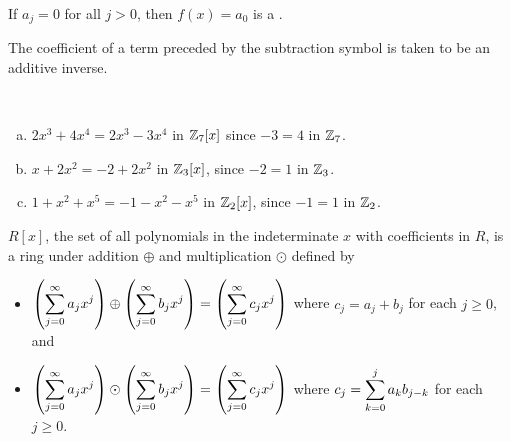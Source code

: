 \documentclass[11pt,fleqn,dvipsnames,usenames]{article}
\newcommand{\p}{\noindent}
\begin{document}
\terminology If $a_{j} = 0$ for all $j > 0$, then $f(x) = a_{0}$ is a .
\vsp

\p The coefficient of a term preceded by the subtraction symbol is taken to be an additive inverse.
\vsp

\begin{examples}~
\begin{enumerate}[(a)]
\item $2x^3 + 4x^4 = 2x^3 - 3x^4$ in $\mathbb{Z}_{7}[x]$ since $-3 = 4$ in $\mathbb{Z}_{7}$.
\item $x + 2x^2 = -2 + 2x^2$ in $\mathbb{Z}_{3}[x]$, since $-2 = 1$ in $\mathbb{Z}_{3}$.
\item $1 + x^2 + x^5 = -1 - x^2 - x^5$ in $\mathbb{Z}_{2}[x]$, since $-1 = 1$ in $\mathbb{Z}_{2}$.
\end{enumerate}
\end{examples}
\vsp

\begin{theorem}\label{RXoperations}
$R[x]$, the set of all polynomials in the indeterminate $x$ with coefficients in $R$, is a ring under addition $\oplus$ and multiplication $\odot$ defined by
\begin{itemize}
\item $\left(\displaystyle\sum\limits_{j=0}^{\infty}a_{j}x^{j}\right)\oplus\left(\displaystyle\sum\limits_{j=0}^{\infty}b_{j}x^{j}\right) =\left(\displaystyle\sum\limits_{j=0}^{\infty}c_{j}x^{j}\right)$ where $c_{j} = a_{j} + b_{j}$ for each $j\geq 0$, and
\item $\left(\displaystyle\sum\limits_{j=0}^{\infty}a_{j}x^{j}\right)\odot\left(\displaystyle\sum\limits_{j=0}^{\infty}b_{j}x^{j}\right) =\left(\displaystyle\sum\limits_{j=0}^{\infty}c_{j}x^{j}\right)$ where
$c_{j} = \displaystyle\sum\limits_{k=0}^{j}a_{k}b_{j-k}$ for each $j\geq 0$.
\end{itemize}
\end{theorem}
\vsp
\end{document}
